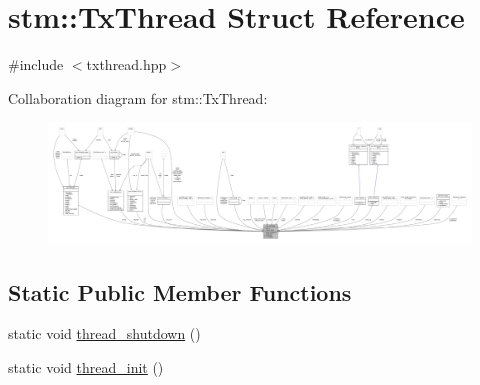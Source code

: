 \hypertarget{structstm_1_1TxThread}{\section{stm\-:\-:Tx\-Thread Struct Reference}
\label{structstm_1_1TxThread}
}


{\ttfamily \#include $<$txthread.\-hpp$>$}



Collaboration diagram for stm\-:\-:Tx\-Thread\-:
\nopagebreak
\begin{figure}[H]
\begin{center}
\leavevmode
\includegraphics[width=350pt]{structstm_1_1TxThread__coll__graph}
\end{center}
\end{figure}
\subsection*{Static Public Member Functions}
\begin{DoxyCompactItemize}
\item 
static void \hyperlink{structstm_1_1TxThread_a34dd6a094b9e5acb32947ca18961c85d}{thread\-\_\-shutdown} ()
\item 
static void \hyperlink{structstm_1_1TxThread_a4e78a4f0dcb5010456aa031d3fda70ac}{thread\-\_\-init} ()
\end{DoxyCompactItemize}

